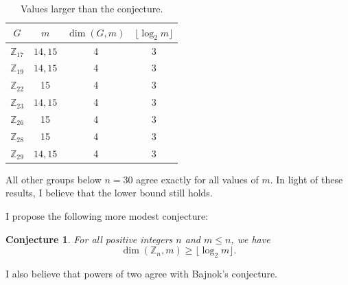 \documentclass[11pt]{article}
\newcommand{\Z}{\mathbb{Z}}
\newtheorem{conj}[thm]{Conjecture}
\begin{document}
\vspace{1em}
\begin{table}[h!]
\centering
\begin{tabular}{c|c|c|c}
$G$  & $m$ & $\dim(G, m)$ & $\lfloor \log_2 m\rfloor$\\ \hline
$\Z_{17}$ & $14,15$ & 4   & 3 \\ \hline
$\Z_{19}$ & $14,15$ & 4   & 3        \\ \hline
$\Z_{22}$ & 15      & 4   & 3      \\ \hline
$\Z_{23}$ & $14,15$ & 4   & 3      \\ \hline
$\Z_{26}$ & 15      & 4     & 3     \\ \hline
$\Z_{28}$ & 15      & 4    & 3    \\ \hline
$\Z_{29}$ & $14,15$ & 4   & 3           
\end{tabular}
\caption{Values larger than the conjecture.}
\end{table}
\vspace{1em}

All other groups below $n=30$ agree exactly for all values of $m$. In light of these results, I believe that the lower bound still holds. 

I propose the following more modest conjecture:
\begin{conj}\label{newZn}
For all positive integers $n$ and $m\leq n$, we have
\[\dim(\Z_n,m)\geq\lfloor\log_2 m\rfloor.\]
\end{conj}

I also believe that powers of two agree with Bajnok's conjecture.
\end{document}
